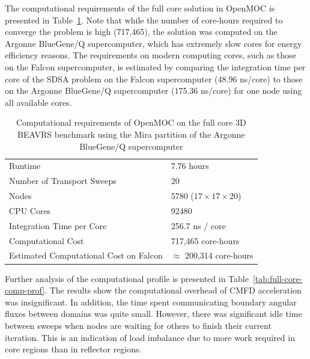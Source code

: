 \documentclass[12pt,twoside]{mitthesis-exec}
\begin{document}
\newpage

The computational requirements of the full core solution in OpenMOC is presented in Table~\ref{tab:full-core-comp-req}. Note that while the number of core-hours required to converge the problem is high (717,465), the solution was computed on the Argonne BlueGene/Q supercomputer, which has extremely slow cores for energy efficiency reasons. The requirements on modern computing cores, such as those on the Falcon supercomputer, is estimated by comparing the integration time per core of the SDSA problem on the Falcon supercomputer (48.96 ns/core) to those on the Argonne BlueGene/Q supercomputer (175.36 ns/core) for one node using all available cores.

\begin{table}[ht]
	\centering
	\caption{Computational requirements of OpenMOC on the full core 3D BEAVRS benchmark using the Mira partition of the Argonne BlueGene/Q supercomputer}
	\medskip
	\begin{tabular}{l|l}
		\hline
		Runtime & 7.76 hours \\
		Number of Transport Sweeps & 20 \\
		Nodes & 5780 ($17 \times 17 \times 20$) \\
		CPU Cores & 92480 \\
		Integration Time per Core & 256.7 ns / core \\
		Computational Cost & 717,465 core-hours \\
		Estimated Computational Cost on Falcon & $\approx$ 200,314 core-hours \\
		\hline
	\end{tabular}
	\label{tab:full-core-comp-req}
\end{table}

Further analysis of the computational profile is presented in Table~\ref{tab:full-core-comp-prof}. The results show the computational overhead of CMFD acceleration was insignificant. In addition, the time spent communicating boundary angular fluxes between domains was quite small. However, there was significant idle time between sweeps when nodes are waiting for others to finish their current iteration. This is an indication of load imbalance due to more work required in core regions than in reflector regions.
\end{document}
